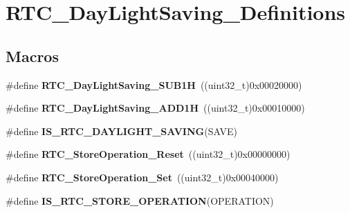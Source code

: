 \hypertarget{group___r_t_c___day_light_saving___definitions}{}\section{R\+T\+C\+\_\+\+Day\+Light\+Saving\+\_\+\+Definitions}
\label{group___r_t_c___day_light_saving___definitions}
\subsection*{Macros}
\begin{DoxyCompactItemize}
\item 
\hypertarget{group___r_t_c___day_light_saving___definitions_gaa037e9c81c2ebae4c30dbe000bc01532}{}\#define {\bfseries R\+T\+C\+\_\+\+Day\+Light\+Saving\+\_\+\+S\+U\+B1\+H}~((uint32\+\_\+t)0x00020000)\label{group___r_t_c___day_light_saving___definitions_gaa037e9c81c2ebae4c30dbe000bc01532}

\item 
\hypertarget{group___r_t_c___day_light_saving___definitions_ga72c25e9ad533dfc00185ebdc359d0c5a}{}\#define {\bfseries R\+T\+C\+\_\+\+Day\+Light\+Saving\+\_\+\+A\+D\+D1\+H}~((uint32\+\_\+t)0x00010000)\label{group___r_t_c___day_light_saving___definitions_ga72c25e9ad533dfc00185ebdc359d0c5a}

\item 
\#define {\bfseries I\+S\+\_\+\+R\+T\+C\+\_\+\+D\+A\+Y\+L\+I\+G\+H\+T\+\_\+\+S\+A\+V\+I\+N\+G}(S\+A\+V\+E)
\item 
\hypertarget{group___r_t_c___day_light_saving___definitions_ga8355e1ca7bd8ccc5130d29605fe3a2cc}{}\#define {\bfseries R\+T\+C\+\_\+\+Store\+Operation\+\_\+\+Reset}~((uint32\+\_\+t)0x00000000)\label{group___r_t_c___day_light_saving___definitions_ga8355e1ca7bd8ccc5130d29605fe3a2cc}

\item 
\hypertarget{group___r_t_c___day_light_saving___definitions_ga4c8817bed02ba11bbe542180b572b0b2}{}\#define {\bfseries R\+T\+C\+\_\+\+Store\+Operation\+\_\+\+Set}~((uint32\+\_\+t)0x00040000)\label{group___r_t_c___day_light_saving___definitions_ga4c8817bed02ba11bbe542180b572b0b2}

\item 
\#define {\bfseries I\+S\+\_\+\+R\+T\+C\+\_\+\+S\+T\+O\+R\+E\+\_\+\+O\+P\+E\+R\+A\+T\+I\+O\+N}(O\+P\+E\+R\+A\+T\+I\+O\+N)
\end{DoxyCompactItemize}


